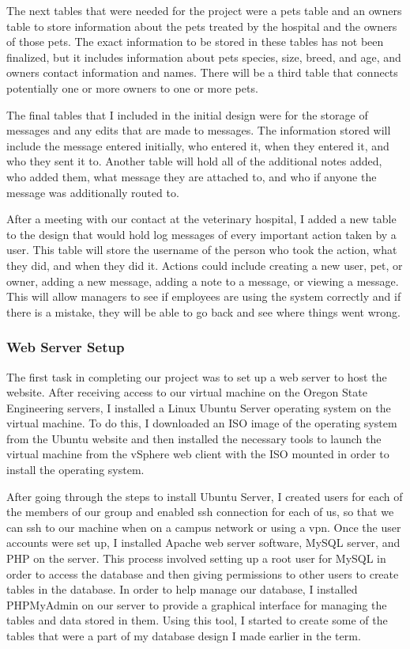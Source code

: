 \documentclass[onecolumn, draftclsnofoot,10pt, compsoc]{IEEEtran}
\begin{document}
The next tables that were needed for the project were a pets table and an owners table to store information about the pets treated by the hospital and the owners of those pets. The exact information to be stored in these tables has not been finalized, but it includes information about pets species, size, breed, and age, and owners contact information and names. There will be a third table that connects potentially one or more owners to one or more pets.

The final tables that I included in the initial design were for the storage of messages and any edits that are made to messages. The information stored will include the message entered initially, who entered it, when they entered it, and who they sent it to. Another table will hold all of the additional notes added, who added them, what message they are attached to, and who if anyone the message was additionally routed to.

After a meeting with our contact at the veterinary hospital, I added a new table to the design that would hold log messages of every important action taken by a user. This table will store the username of the person who took the action, what they did, and when they did it. Actions could include creating a new user, pet, or owner, adding a new message, adding a note to a message, or viewing a message. This will allow managers to see if employees are using the system correctly and if there is a mistake, they will be able to go back and see where things went wrong.

\subsubsection{Web Server Setup}
The first task in completing our project was to set up a web server to host the website. After receiving access to our virtual machine on the Oregon State Engineering servers, I installed a Linux Ubuntu Server operating system on the virtual machine. To do this, I downloaded an ISO image of the operating system from the Ubuntu website and then installed the necessary tools to launch the virtual machine from the vSphere web client with the ISO mounted in order to install the operating system. 

After going through the steps to install Ubuntu Server, I created users for each of the members of our group and enabled ssh connection for each of us, so that we can ssh to our machine when on a campus network or using a vpn. Once the user accounts were set up, I installed Apache web server software, MySQL server, and PHP on the server. This process involved setting up a root user for MySQL in order to access the database and then giving permissions to other users to create tables in the database. In order to help manage our database, I installed PHPMyAdmin on our server to provide a graphical interface for managing the tables and data stored in them. Using this tool, I started to create some of the tables that were a part of my database design I made earlier in the term.
\end{document}
